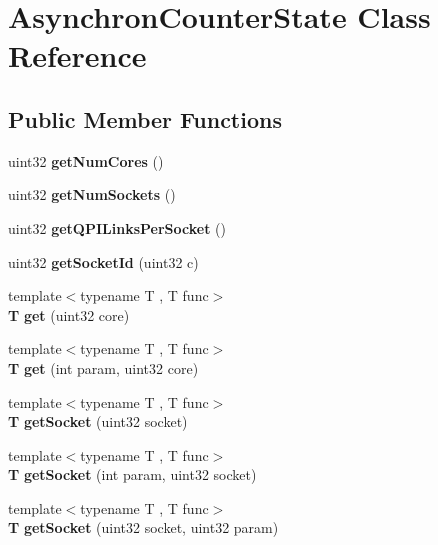 \section{Asynchron\+Counter\+State Class Reference}
\label{classAsynchronCounterState}
\subsection*{Public Member Functions}
\begin{DoxyCompactItemize}
\item 
uint32 {\bfseries get\+Num\+Cores} ()\label{classAsynchronCounterState_ae50ebd3674b3ba52ff25f46b4eeb3956}

\item 
uint32 {\bfseries get\+Num\+Sockets} ()\label{classAsynchronCounterState_aad5f8ed144ee05d32c4b82e8664ea294}

\item 
uint32 {\bfseries get\+Q\+P\+I\+Links\+Per\+Socket} ()\label{classAsynchronCounterState_ab221a101212adceb2a248691eca8db1a}

\item 
uint32 {\bfseries get\+Socket\+Id} (uint32 c)\label{classAsynchronCounterState_a9121ce142b39fd845f6c4eb101c214bf}

\item 
{\footnotesize template$<$typename T , T  func$>$ }\\{\bf T} {\bfseries get} (uint32 core)\label{classAsynchronCounterState_a8f8e4539b38c5f171faa235b196e6f6a}

\item 
{\footnotesize template$<$typename T , T  func$>$ }\\{\bf T} {\bfseries get} (int param, uint32 core)\label{classAsynchronCounterState_aa77c2086bbaa8214dc60176f6ba08e43}

\item 
{\footnotesize template$<$typename T , T  func$>$ }\\{\bf T} {\bfseries get\+Socket} (uint32 socket)\label{classAsynchronCounterState_a272fad1f3bd704f873c9c3a29e95192b}

\item 
{\footnotesize template$<$typename T , T  func$>$ }\\{\bf T} {\bfseries get\+Socket} (int param, uint32 socket)\label{classAsynchronCounterState_aba3224acb89e692bb7024c85a516b8cb}

\item 
{\footnotesize template$<$typename T , T  func$>$ }\\{\bf T} {\bfseries get\+Socket} (uint32 socket, uint32 param)\label{classAsynchronCounterState_ac5441bad9ff3aaccbe5b3b8965e091d2}


\end{DoxyCompactItemize}
